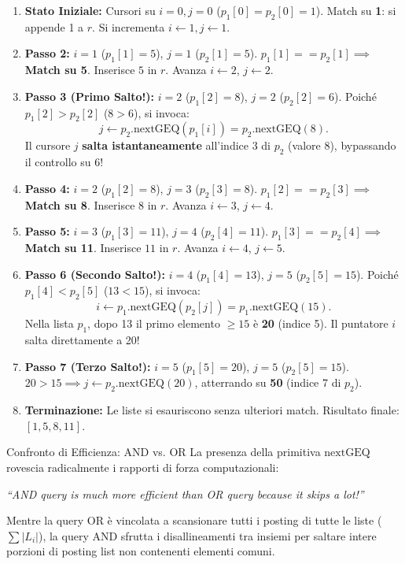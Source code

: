 \begin{enumerate}
    \item \textbf{Stato Iniziale:} Cursori su $i=0, j=0$ ($p_1[0] = p_2[0] = 1$).
    Match su \textbf{1}: si appende 1 a $r$. Si incrementa $i \gets 1, j \gets 1$.
    \item \textbf{Passo 2:} $i = 1$ ($p_1[1] = 5$), $j = 1$ ($p_2[1] = 5$).
    $p_1[1] == p_2[1] \implies$ \textbf{Match su 5}. Inserisce $5$ in $r$. Avanza $i \gets 2$, $j \gets 2$.
    \item \textbf{Passo 3 (Primo Salto!):} $i = 2$ ($p_1[2] = 8$), $j = 2$ ($p_2[2] = 6$).
    Poich\'e $p_1[2] > p_2[2]$ ($8 > 6$), si invoca:
    \[
    j \gets p_2.\text{nextGEQ}(p_1[i]) = p_2.\text{nextGEQ}(8).
    \]
    Il cursore $j$ \textbf{salta istantaneamente} all'indice 3 di $p_2$ (valore 8), bypassando il controllo su 6!
    \item \textbf{Passo 4:} $i = 2$ ($p_1[2] = 8$), $j = 3$ ($p_2[3] = 8$).
    $p_1[2] == p_2[3] \implies$ \textbf{Match su 8}. Inserisce $8$ in $r$. Avanza $i \gets 3$, $j \gets 4$.
    \item \textbf{Passo 5:} $i = 3$ ($p_1[3] = 11$), $j = 4$ ($p_2[4] = 11$).
    $p_1[3] == p_2[4] \implies$ \textbf{Match su 11}. Inserisce $11$ in $r$. Avanza $i \gets 4$, $j \gets 5$.
    \item \textbf{Passo 6 (Secondo Salto!):} $i = 4$ ($p_1[4] = 13$), $j = 5$ ($p_2[5] = 15$).
    Poich\'e $p_1[4] < p_2[5]$ ($13 < 15$), si invoca:
    \[
    i \gets p_1.\text{nextGEQ}(p_2[j]) = p_1.\text{nextGEQ}(15).
    \]
    Nella lista $p_1$, dopo 13 il primo elemento $\ge 15$ \`e \textbf{20} (indice 5). Il puntatore $i$ salta direttamente a 20!
    \item \textbf{Passo 7 (Terzo Salto!):} $i = 5$ ($p_1[5] = 20$), $j = 5$ ($p_2[5] = 15$).
    $20 > 15 \implies j \gets p_2.\text{nextGEQ}(20)$, atterrando su \textbf{50} (indice 7 di $p_2$).
    \item \textbf{Terminazione:} Le liste si esauriscono senza ulteriori match. Risultato finale: $[1, 5, 8, 11]$.
\end{enumerate}

\begin{noteblock}{Confronto di Efficienza: AND vs. OR}
La presenza della primitiva $\text{nextGEQ}$ rovescia radicalmente i rapporti di forza computazionali:
\begin{center}
\textit{``AND query is much more efficient than OR query because it skips a lot!''}
\end{center}
Mentre la query OR \`e vincolata a scansionare tutti i posting di tutte le liste ($\sum |L_i|$), la query AND sfrutta i disallineamenti tra insiemi per saltare intere porzioni di posting list non contenenti elementi comuni.
\end{noteblock}

